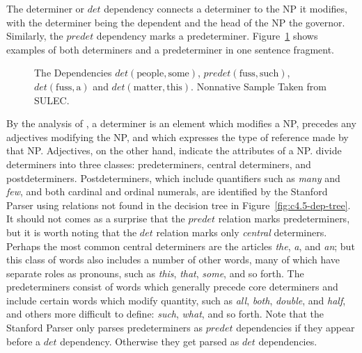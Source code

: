 \documentclass[main.tex]{subfiles}
\begin{document}
The determiner or $det$ dependency connects a determiner to the NP it modifies, with the determiner being the dependent and the head of the NP the governor. Similarly, the $predet$ dependency marks a predeterminer. Figure~\ref{ex:det} shows examples of both determiners and a predeterminer in one sentence fragment. 
\begin{figure}[ht]
\centering
{}
\caption[The Dependencies $det(\text{people},\text{some})$, $predet(\text{fuss},\text{such})$, etc.]{The Dependencies $det(\text{people},\text{some})$, $predet(\text{fuss},\text{such})$, $det(\text{fuss},\text{a})$ and $det(\text{matter},\text{this})$. Nonnative Sample Taken from SULEC.}
\label{ex:det}
\end{figure}
By the analysis of \citet[p. 253]{quirk:1985}, a determiner is an element which modifies a NP, precedes any adjectives modifying the NP, and which expresses the type of reference made by that NP. Adjectives, on the other hand, indicate the attributes of a NP. \citeauthor{quirk:1985} divide determiners into three classes: predeterminers, central determiners, and postdeterminers. Postdeterminers, which include quantifiers such as \textit{many} and \textit{few}, and both cardinal and ordinal numerals, are identified by the Stanford Parser using relations not found in the decision tree in Figure~\ref{fig:c4.5-dep-tree}. It should not comes as a surprise that the $predet$ relation marks predeterminers, but it is worth noting that the $det$ relation marks only \textit{central} determiners. Perhaps the most common central determiners are the articles \textit{the}, \textit{a}, and \textit{an}; but this class of words also includes a number of other words, many of which have separate roles as pronouns, such as \textit{this}, \textit{that}, \textit{some}, and so forth. The predeterminers consist of words which generally precede core determiners and include certain words which modify quantity, such as \textit{all}, \textit{both}, \textit{double}, and \textit{half}, and others more difficult to define: \textit{such}, \textit{what}, and so forth. Note that the Stanford Parser only parses predeterminers as $predet$ dependencies if they appear before a $det$ dependency. Otherwise they get parsed as $det$ dependencies.
\end{document}

